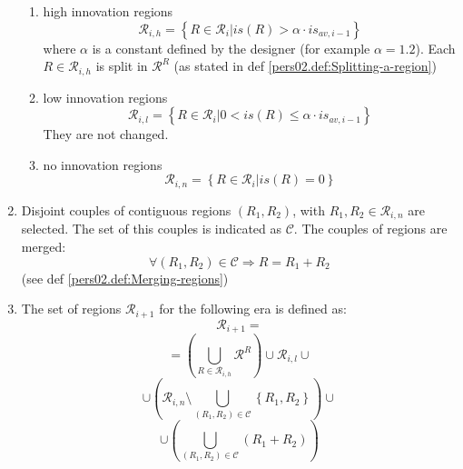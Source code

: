 \begin{enumerate}
\begin{enumerate}
\item high innovation regions 
\[
\mathcal{R}_{i,h}=\left\{ \left.R\in\mathcal{R}_{i}\right|is\left(R\right)>\alpha\cdot is_{av,i-1}\right\} 
\]
 where $\alpha$ is a constant defined by the designer (for example
$\alpha=1.2$). Each $R\in\mathcal{R}_{i,h}$ is split in $\mathcal{R}^{R}$
(as stated in def \ref{pers02.def:Splitting-a-region})
\item low innovation regions 
\[
\mathcal{R}_{i,l}=\left\{ \left.R\in\mathcal{R}_{i}\right|0<is\left(R\right)\le\alpha\cdot is_{av,i-1}\right\} 
\]
They are not changed.
\item no innovation regions 
\[
\mathcal{R}_{i,n}=\left\{ \left.R\in\mathcal{R}_{i}\right|is\left(R\right)=0\right\} 
\]
\end{enumerate}

\item Disjoint couples of contiguous regions $\left(R_{1},R_{2}\right)$,
with $R_{1},R_{2}\in\mathcal{R}_{i,n}$ are selected. The set of this
couples is indicated as $\mathcal{C}$. The couples of regions are
merged:
\[
\forall\left(R_{1},R_{2}\right)\in\mathcal{C}\Rightarrow R=R_{1}+R_{2}
\]
 (see def \ref{pers02.def:Merging-regions})
\item The set of regions $\mathcal{R}_{i+1}$ for the following era is defined
as:
\[
\mathcal{R}_{i+1}=
\]
\[
=\left(\bigcup_{R\in\mathcal{R}_{i,h}}\mathcal{R}^{R}\right)\cup\mathcal{R}_{i,l}\cup
\]
\[
\cup\left(\mathcal{R}_{i,n}\setminus\bigcup_{\left(R_{1},R_{2}\right)\in\mathcal{C}}\left\{ R_{1},R_{2}\right\} \right)\cup
\]
\[
\cup\left(\bigcup_{\left(R_{1},R_{2}\right)\in\mathcal{C}}\left(R_{1}+R_{2}\right)\right)
\]

\end{enumerate}

